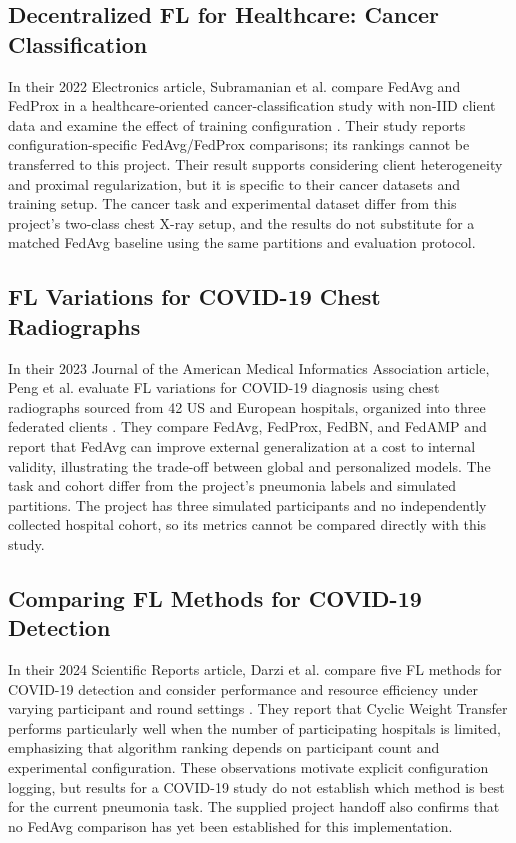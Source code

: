 \documentclass[12pt,a4paper]{report}
\begin{document}
\subsection{Decentralized FL for Healthcare: Cancer Classification}
In their 2022 Electronics article, Subramanian et al. compare FedAvg and FedProx in a healthcare-oriented cancer-classification study with non-IID client data and examine the effect of training configuration \cite{subramanian2022healthcare}. Their study reports configuration-specific FedAvg/FedProx comparisons; its rankings cannot be transferred to this project. Their result supports considering client heterogeneity and proximal regularization, but it is specific to their cancer datasets and training setup. The cancer task and experimental dataset differ from this project's two-class chest X-ray setup, and the results do not substitute for a matched FedAvg baseline using the same partitions and evaluation protocol.

\subsection{FL Variations for COVID-19 Chest Radiographs}
In their 2023 Journal of the American Medical Informatics Association article, Peng et al. evaluate FL variations for COVID-19 diagnosis using chest radiographs sourced from 42 US and European hospitals, organized into three federated clients \cite{peng2023covid}. They compare FedAvg, FedProx, FedBN, and FedAMP and report that FedAvg can improve external generalization at a cost to internal validity, illustrating the trade-off between global and personalized models. The task and cohort differ from the project's pneumonia labels and simulated partitions. The project has three simulated participants and no independently collected hospital cohort, so its metrics cannot be compared directly with this study.

\subsection{Comparing FL Methods for COVID-19 Detection}
In their 2024 Scientific Reports article, Darzi et al. compare five FL methods for COVID-19 detection and consider performance and resource efficiency under varying participant and round settings \cite{darzi2024covid}. They report that Cyclic Weight Transfer performs particularly well when the number of participating hospitals is limited, emphasizing that algorithm ranking depends on participant count and experimental configuration. These observations motivate explicit configuration logging, but results for a COVID-19 study do not establish which method is best for the current pneumonia task. The supplied project handoff also confirms that no FedAvg comparison has yet been established for this implementation.
\end{document}
